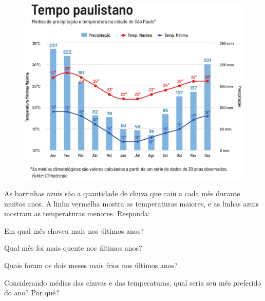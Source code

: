 \begin{figure}[htpb!]
\centering
\includegraphics[width=.8\textwidth]{./media/image91.png}
\end{figure}

\pagebreak

As barrinhas azuis são a quantidade de chuva que caiu a cada mês durante
muitos anos. A linha vermelha mostra as temperaturas maiores, e as
linhas azuis mostram as temperaturas menores. Responda:

\begin{escolha}
\item Em qual mês choveu mais nos últimos anos?

\item Qual mês foi mais quente nos últimos anos?

\item Quais foram os dois meses mais frios nos últimos anos?

\item Considerando médias das chuvas e das temperaturas, qual seria seu mês preferido do ano? Por quê?
\end{escolha}

\pagebreak

